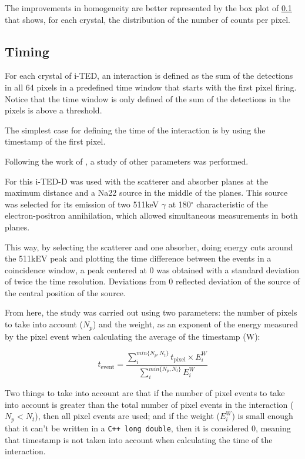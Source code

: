 The improvements in homogeneity are better represented by the box plot of \ref{} that shows, for each crystal, the distribution of the number of counts per pixel.

\subsection{Timing}

For each crystal of \ac{i-TED}, an interaction is defined as the sum of the detections in all 64 pixels in a predefined time window that starts with the first pixel firing. Notice that the time window is only defined of the sum of the detections in the pixels is above a threshold.

The simplest case for defining the time of the interaction is by using the timestamp of the first pixel.

Following the work of \cite{LAMPROU202010}, a study of other parameters was performed.

For this \ac{i-TED}-D was used with the scatterer and absorber planes at the maximum distance and a Na22 source in the middle of the planes. This source was selected for its emission of two 511keV $\gamma$ at 180$^\circ$ characteristic of the electron-positron annihilation, which allowed simultaneous measurements in both planes.

This way, by selecting the scatterer and one absorber, doing energy cuts around the 511kEV peak and plotting the time difference between the events in a coincidence window, a peak centered at 0 was obtained with a standard deviation of twice the time resolution. Deviations from 0 reflected deviation of the source of the central position of the source.

From here, the study was carried out using two parameters: the number of pixels to take into account ($N_p$) and the weight, as an exponent of the energy measured by the pixel event when calculating the average of the timestamp (W):

\begin{equation}
    t_\text{event}=\frac{\sum_{i}^{min\{N_p,N_t\}}t_\text{pixel}\times E_i^W}{\sum_{i}^{min\{N_p,N_t\}}E_i^W}
\end{equation}

Two things to take into account are that if the number of pixel events to take into account is greater than the total number of pixel events in the interaction ($N_p<N_t$), then all pixel events are used; and if the weight ($E_i^W$) is small enough that it can't be written in a \texttt{C++ long double}, then it is considered 0, meaning that timestamp is not taken into account when calculating the time of the interaction.

